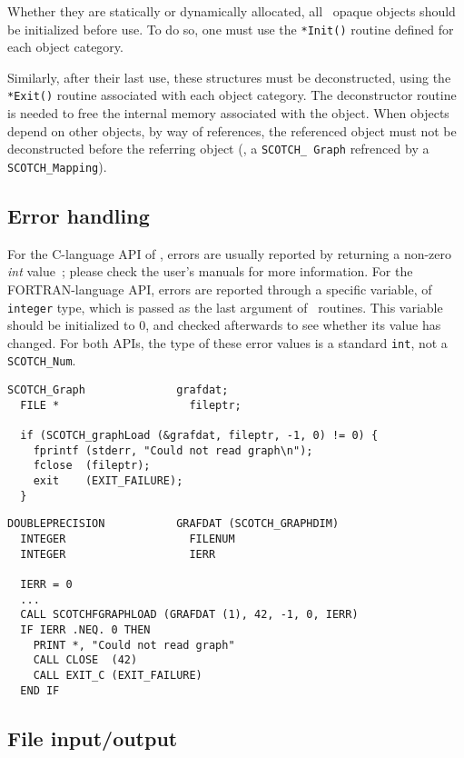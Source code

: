 Whether they are statically or dynamically allocated, all
\scotch\ opaque objects should be initialized before use. To do so,
one must use the \texttt{*Init()} routine defined for each object
category.

Similarly, after their last use, these structures must be
deconstructed, using the \texttt{*Exit()} routine associated with each
object category. The deconstructor routine is needed to free the
internal memory associated with the object. When objects depend on
other objects, by way of references, the referenced object must not be
deconstructed before the referring object (\eg, a \texttt{SCOTCH\_\lbt
Graph} refrenced by a \texttt{SCOTCH\_\lbt Mapping}).

\subsection{Error handling}

For the \textsc{C}-language API of \scotch, errors are usually
reported by returning a non-zero \textit{int} value~; please check the
user's manuals for more information. For the \textsc{FORTRAN}-language
API, errors are reported through a specific variable, of
\texttt{integer} type, which is passed as the last argument of
\scotch\ routines. This variable should be initialized to $0$, and
checked afterwards to see whether its value has changed. For both
APIs, the type of these error values is a standard \texttt{int}, not a
\texttt{SCOTCH\_\lbt Num}.

\begin{lstlisting}[style=language-c]
  SCOTCH_Graph              grafdat;
  FILE *                    fileptr;

  if (SCOTCH_graphLoad (&grafdat, fileptr, -1, 0) != 0) {
    fprintf (stderr, "Could not read graph\n");
    fclose  (fileptr);
    exit    (EXIT_FAILURE);
  }
\end{lstlisting}

\begin{lstlisting}[style=language-f]
  DOUBLEPRECISION           GRAFDAT (SCOTCH_GRAPHDIM)
  INTEGER                   FILENUM
  INTEGER                   IERR

  IERR = 0
  ...
  CALL SCOTCHFGRAPHLOAD (GRAFDAT (1), 42, -1, 0, IERR)
  IF IERR .NEQ. 0 THEN
    PRINT *, "Could not read graph"
    CALL CLOSE  (42)
    CALL EXIT_C (EXIT_FAILURE)
  END IF
\end{lstlisting}

\subsection{File input/output}

